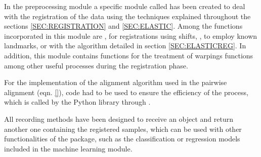 
In the preprocessing module a specific module called  has
been created to deal with the registration of the data using the techniques
explained throughout the sections \ref{SEC:REGISTRATION} and \ref{SEC:ELASTIC}.
Among the functions incorporated in this module are ,
for registrations using shifts, ,
to employ known landmarks, or  with the algorithm
detailed in section \ref{SEC:ELASTICREG}.
In addition, this module contains functions for the treatment of
warpings functions among other useful processes during the registration phase.


For the implementation of the alignment algorithm used in the pairwise alignment
(eqn. \ref{}), code  had to be used to ensure the efficiency of the process,
which is called by the Python library through .

All recording methods have been designed to receive an  object and
return another one containing the registered samples, which can be used with
other functionalities of the package, such as the classification or regression
models included in the machine learning module.

